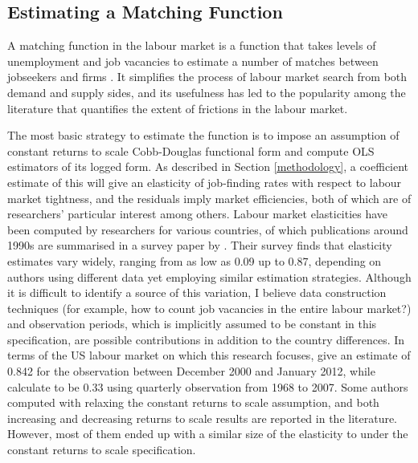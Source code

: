 \documentclass[a4paper, 11pt, tikz]{article}
\begin{document}
\subsection{Estimating a Matching Function}
A matching function in the labour market is a function that takes levels of unemployment and job vacancies to estimate a number of matches between jobseekers and firms \citep{pissarides2000equilibrium}.
It simplifies the process of labour market search from both demand and supply sides, and its usefulness has led to the popularity among the literature that quantifies the extent of frictions in the labour market.

The most basic strategy to estimate the function is to impose an assumption of constant returns to scale Cobb-Douglas functional form and compute OLS estimators of its logged form.
As described in Section \ref{methodology}, a coefficient estimate of this will give an elasticity of job-finding rates with respect to labour market tightness, and the residuals imply market efficiencies, both of which are of researchers' particular interest among others.
Labour market elasticities have been computed by researchers for various countries, of which publications around 1990s are summarised in a survey paper by \cite{petrongolo2001looking}.
Their survey finds that elasticity estimates vary widely, ranging from as low as 0.09 up to 0.87, depending on authors using different data yet employing similar estimation strategies.
Although it is difficult to identify a source of this variation, I believe data construction techniques (for example, how to count job vacancies in the entire labour market?) and observation periods, which is implicitly assumed to be constant in this specification, are possible contributions in addition to the country differences.
In terms of the US labour market on which this research focuses, \cite{borowczyk-martins2013accounting} give an estimate of 0.842 for the observation between December 2000 and January 2012, while \cite{barnichon2015labor} calculate to be 0.33 using quarterly observation from 1968 to 2007.
Some authors computed with relaxing the constant returns to scale assumption, and both increasing and decreasing returns to scale results are reported in the literature.
However, most of them ended up with a similar size of the elasticity to under the constant returns to scale specification.
\end{document}
